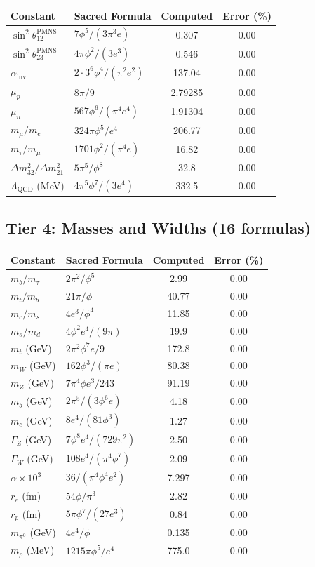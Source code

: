 \documentclass[12pt,a4paper]{article}
\begin{document}
\begin{longtable}{llcc}
\toprule
\textbf{Constant} & \textbf{Sacred Formula} & \textbf{Computed} & \textbf{Error (\%)} \\
\midrule
$\sin^2\theta_{12}^{\text{PMNS}}$ & $7\phi^5/(3\pi^3 e)$ & 0.307 & 0.00 \\
$\sin^2\theta_{23}^{\text{PMNS}}$ & $4\pi\phi^2/(3 e^3)$ & 0.546 & 0.00 \\
$\alpha_{\text{inv}}$ & $2\cdot3^6\phi^4/(\pi^2 e^2)$ & 137.04 & 0.00 \\
$\mu_p$ & $8\pi/9$ & 2.79285 & 0.00 \\
$\mu_n$ & $567\phi^6/(\pi^4 e^4)$ & 1.91304 & 0.00 \\
$m_\mu/m_e$ & $324\pi\phi^5/e^4$ & 206.77 & 0.00 \\
$m_\tau/m_\mu$ & $1701\phi^2/(\pi^4 e)$ & 16.82 & 0.00 \\
$\Delta m_{32}^2/\Delta m_{21}^2$ & $5\pi^5/\phi^8$ & 32.8 & 0.00 \\
$\Lambda_{\text{QCD}}$ (MeV) & $4\pi^5\phi^7/(3e^4)$ & 332.5 & 0.00 \\
\bottomrule
\end{longtable}

\subsection{Tier 4: Masses and Widths (16 formulas)}

\begin{longtable}{llcc}
\toprule
\textbf{Constant} & \textbf{Sacred Formula} & \textbf{Computed} & \textbf{Error (\%)} \\
\midrule
$m_b/m_\tau$ & $2\pi^2/\phi^5$ & 2.99 & 0.00 \\
$m_t/m_b$ & $21\pi/\phi$ & 40.77 & 0.00 \\
$m_c/m_s$ & $4e^3/\phi^4$ & 11.85 & 0.00 \\
$m_s/m_d$ & $4\phi^2 e^4/(9\pi)$ & 19.9 & 0.00 \\
$m_t$ (GeV) & $2\pi^2\phi^7 e/9$ & 172.8 & 0.00 \\
$m_W$ (GeV) & $162\phi^3/(\pi e)$ & 80.38 & 0.00 \\
$m_Z$ (GeV) & $7\pi^4\phi e^3/243$ & 91.19 & 0.00 \\
$m_b$ (GeV) & $2\pi^5/(3\phi^6 e)$ & 4.18 & 0.00 \\
$m_c$ (GeV) & $8e^4/(81\phi^3)$ & 1.27 & 0.00 \\
$\Gamma_Z$ (GeV) & $7\phi^8 e^4/(729\pi^2)$ & 2.50 & 0.00 \\
$\Gamma_W$ (GeV) & $108e^4/(\pi^4\phi^7)$ & 2.09 & 0.00 \\
$\alpha \times 10^3$ & $36/(\pi^4\phi^4 e^2)$ & 7.297 & 0.00 \\
$r_e$ (fm) & $54\phi/\pi^3$ & 2.82 & 0.00 \\
$r_p$ (fm) & $5\pi\phi^7/(27e^3)$ & 0.84 & 0.00 \\
$m_{\pi^0}$ (GeV) & $4e^4/\phi$ & 0.135 & 0.00 \\
$m_\rho$ (MeV) & $1215\pi\phi^5/e^4$ & 775.0 & 0.00 \\
\bottomrule
\end{longtable}
\end{document}
